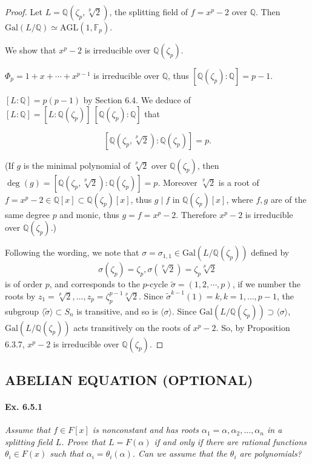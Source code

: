 \documentclass[11pt,a4paper]{article}
\newcommand{\Q}{\mathbb{Q}}
\newcommand{\F}{\mathbb{F}}
\newcommand{\Gal}{\mathrm{Gal}}
\begin{document}
\begin{proof}
Let $L = \Q(\zeta_p,\sqrt[p]{2})$, the splitting field of $f = x^p-2$ over $\Q$. Then $\Gal(L/\Q) \simeq \mathrm{AGL}(1,\F_p)$.

We show that $x^p-2$ is irreducible over $\Q(\zeta_p)$.


$\Phi_p=1+x+\cdots+x^{p-1}$ is irreducible over $\Q$, thus $[\Q(\zeta_p):\Q] = p-1$.

$[L:\Q] = p(p-1)$ by Section 6.4.  We deduce of $[L:\Q] = [L:\Q(\zeta_p)]\ [\Q(\zeta_p):\Q]$ that

$$[\Q(\zeta_p,\sqrt[p]{2}) : \Q(\zeta_p)]  = p.$$

(If $g$ is the minimal polynomial of $\sqrt[p]{2}$ over $\Q(\zeta_p)$, then ${\deg(g) = [\Q(\zeta_p,\sqrt[p]{2}) : \Q(\zeta_p)] } = p$. Moreover $\sqrt[p]{2}$ is a root of $f=x^p-2\in \Q[x] \subset\Q(\zeta_p)[x]$, thus $g \mid f$ in $\Q(\zeta_p)[x]$, where $f,g$ are of the same degree  $p$ and monic, thus $g=f = x^p-2$. Therefore $x^p-2$ is irreducible over $\Q(\zeta_p)$.)

Following the wording, we note that $\sigma = \sigma_{1,1} \in \Gal(L/\Q(\zeta_p))$ defined by 
$$\sigma(\zeta_p) = \zeta_p, \sigma(\sqrt[p]{2}) = \zeta_p  \sqrt[p]{2}$$
is of order $p$, and corresponds to the $p$-cycle $\tilde{\sigma} = (1, 2, \cdots, p)$, if we number the roots by $z_1 = \sqrt[p]{2}, \ldots,  z_p= \zeta_p^{p-1} \sqrt[p]{2}$. Since $\tilde{\sigma}^{k-1}(1) = k, k = 1, \ldots, p-1$, the subgroup $\langle \tilde{\sigma} \rangle \subset S_n$ is transitive, and so is $\langle \sigma \rangle$. Since $\Gal(L/\Q(\zeta_p)) \supset \langle \sigma \rangle$, $\Gal(L/\Q(\zeta_p))$ acts transitively on the roots of $x^p - 2$. So, by Proposition 6.3.7, $x^p - 2$ is irreducible over $\Q(\zeta_p)$.

\end{proof}

\subsection{ABELIAN EQUATION (OPTIONAL)}
\paragraph{Ex. 6.5.1}

{\it Assume that $f\in F[x]$ is nonconstant and has roots $\alpha_1 = \alpha,\alpha_2,\ldots,\alpha_n$ in a splitting field $L$. Prove that $L = F(\alpha)$ if and only if there are rational functions $\theta_i \in F(x)$ such that $\alpha_i = \theta_i(\alpha)$. Can we assume that the $\theta_i$ are polynomials?
}
\end{document}
